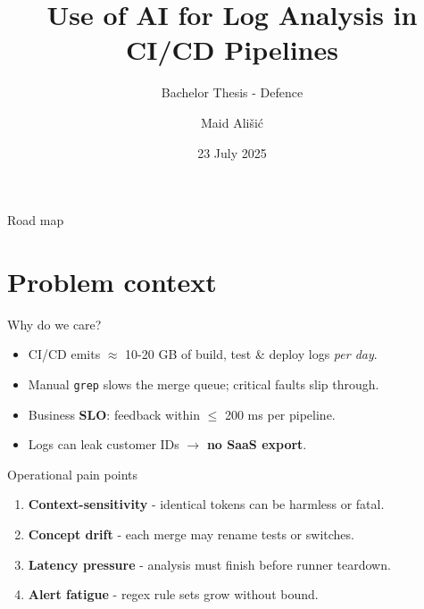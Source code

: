 \documentclass[15pt,aspectratio=169]{beamer}
\title{Use of AI for Log Analysis in CI/CD Pipelines}
\subtitle{Bachelor Thesis - Defence}
\author{Maid Ališi\'c}
\institute{FH Oberösterreich · Campus Hagenberg}
\date{23 July 2025}
\begin{document}

\maketitle

\begin{frame}{Road map}
  \tableofcontents[hideallsubsections]
\end{frame}

\section{Problem context}

\begin{frame}{Why do we care?}
\begin{itemize}[<+->]
  \item CI/CD emits \alert{$\approx$ 10-20 GB} of build, test \& deploy logs \textit{per day}. 
  \item Manual \texttt{grep} slows the merge queue; critical faults slip through.
  \item Business \textbf{SLO}: feedback within \alert{\(\le\) 200 ms} per pipeline.
  \item Logs can leak customer IDs $\rightarrow$ \textbf{no SaaS export}.
\end{itemize}
\end{frame}

\begin{frame}{Operational pain points}
\begin{enumerate}[<+->]
  \item \textbf{Context-sensitivity} - identical tokens can be harmless or fatal.
  \item \textbf{Concept drift} - each merge may rename tests or switches.
  \item \textbf{Latency pressure} - analysis must finish before runner teardown.
  \item \textbf{Alert fatigue} - regex rule sets grow without bound.
\end{enumerate}
\end{frame}
\end{document}
